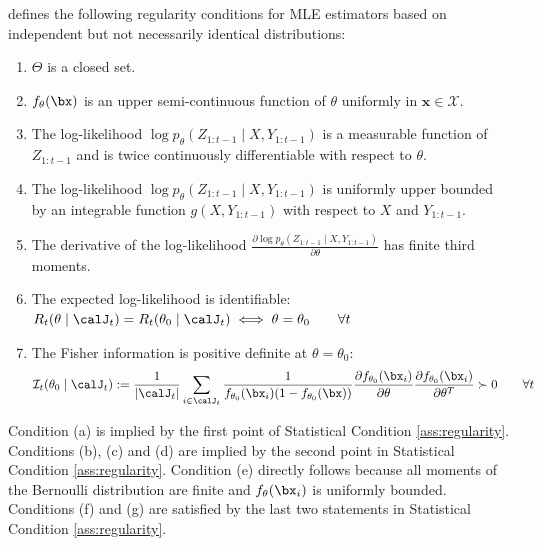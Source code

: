 \documentclass[blindrev]{informs3noheader}
\begin{document}
\cite{hoadley1971asymptotic} defines the following regularity conditions for MLE estimators based on independent but not necessarily identical distributions:
\begin{enumerate}[label=(\alph*)]
\item $\Theta$ is a closed set.
\item $f_\theta(\bx)$ is an upper semi-continuous function of $\theta$ uniformly in $\bm{x} \in \mathcal{X}$.
\item The log-likelihood $\log p_\theta(Z_{1:t-1} \mid X, Y_{1:t-1})$ is a measurable function of $Z_{1:t-1}$ and is twice continuously differentiable with respect to $\theta$.
\item The log-likelihood $\log p_\theta(Z_{1:t-1} \mid X, Y_{1:t-1})$ is uniformly upper bounded by an integrable function $g(X, Y_{1:t-1})$ with respect to $X$ and $Y_{1:t-1}$. 
\item The derivative of the log-likelihood $\frac{\partial \log p_\theta(Z_{1:t-1} \mid X, Y_{1:t-1})}{\partial \theta}$ has finite third moments. 
\item The expected log-likelihood is identifiable: $R_t(\theta \mid \calJ_t)=R_t(\theta_0\mid \calJ_t) \iff \theta = \theta_0\qquad \forall t$
\item The Fisher information is positive definite at $\theta=\theta_0$:
\[\mathcal{I}_t(\theta_0\mid \calJ_t) := \frac{1}{|\calJ_t|} \sum_{i \in \calJ_t}\frac{1}{f_{\theta_0}(\bx_i)(1-f_{\theta_0}(\bx))}\frac{\partial f_{\theta_0}(\bx_i)}{\partial \theta}\frac{\partial f_{\theta_0}(\bx_i)}{\partial \theta^T} \succ 0 \qquad \forall t\]
\end{enumerate}
Condition (a) is implied by the first point of Statistical Condition \ref{ass:regularity}. Conditions  (b), (c) and (d) are implied by the second point in Statistical Condition \ref{ass:regularity}. Condition (e) directly follows because all moments of the Bernoulli distribution are finite and $f_\theta(\bx_i)$ is uniformly bounded. Conditions (f) and (g) are satisfied by the last two statements in Statistical Condition \ref{ass:regularity}. 
\end{document}
